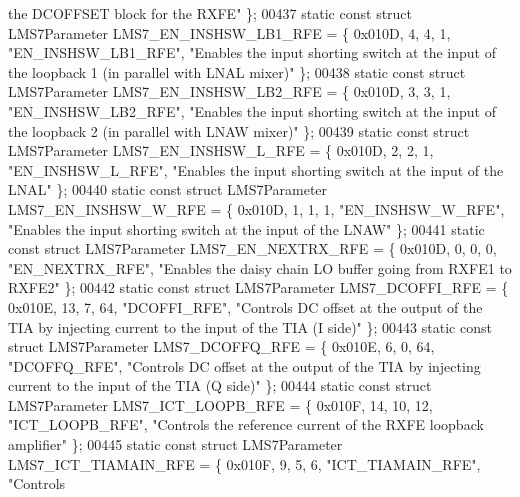 \begin{DoxyCode}
{       the DCOFFSET block for the RXFE"} \};
00437 \textcolor{keyword}{static} \textcolor{keyword}{const} \textcolor{keyword}{struct }LMS7Parameter LMS7_EN_INSHSW_LB1_RFE = \{ 0x010D, 4, 4, 1, \textcolor{stringliteral}{"EN\_INSHSW\_LB1\_RFE"}, \textcolor{stringliteral}{"Enables
       the input shorting switch at the input  of the loopback 1 (in parallel with LNAL mixer)"} \};
00438 \textcolor{keyword}{static} \textcolor{keyword}{const} \textcolor{keyword}{struct }LMS7Parameter LMS7_EN_INSHSW_LB2_RFE = \{ 0x010D, 3, 3, 1, \textcolor{stringliteral}{"EN\_INSHSW\_LB2\_RFE"}, \textcolor{stringliteral}{"Enables
       the input shorting switch at the input  of the loopback 2 (in parallel with LNAW mixer)"} \};
00439 \textcolor{keyword}{static} \textcolor{keyword}{const} \textcolor{keyword}{struct }LMS7Parameter LMS7_EN_INSHSW_L_RFE = \{ 0x010D, 2, 2, 1, \textcolor{stringliteral}{"EN\_INSHSW\_L\_RFE"}, \textcolor{stringliteral}{"Enables the
       input shorting switch at the input  of the LNAL"} \};
00440 \textcolor{keyword}{static} \textcolor{keyword}{const} \textcolor{keyword}{struct }LMS7Parameter LMS7_EN_INSHSW_W_RFE = \{ 0x010D, 1, 1, 1, \textcolor{stringliteral}{"EN\_INSHSW\_W\_RFE"}, \textcolor{stringliteral}{"Enables the
       input shorting switch at the input  of the LNAW"} \};
00441 \textcolor{keyword}{static} \textcolor{keyword}{const} \textcolor{keyword}{struct }LMS7Parameter LMS7_EN_NEXTRX_RFE = \{ 0x010D, 0, 0, 0, \textcolor{stringliteral}{"EN\_NEXTRX\_RFE"}, \textcolor{stringliteral}{"Enables the
       daisy chain LO buffer going from RXFE1  to RXFE2"} \};
00442 \textcolor{keyword}{static} \textcolor{keyword}{const} \textcolor{keyword}{struct }LMS7Parameter LMS7_DCOFFI_RFE = \{ 0x010E, 13, 7, 64, \textcolor{stringliteral}{"DCOFFI\_RFE"}, \textcolor{stringliteral}{"Controls DC offset
       at the output of the TIA by injecting current to the input of the TIA (I side)"} \};
00443 \textcolor{keyword}{static} \textcolor{keyword}{const} \textcolor{keyword}{struct }LMS7Parameter LMS7_DCOFFQ_RFE = \{ 0x010E, 6, 0, 64, \textcolor{stringliteral}{"DCOFFQ\_RFE"}, \textcolor{stringliteral}{"Controls DC offset
       at the output of the TIA by injecting current to the input of the TIA (Q side)"} \};
00444 \textcolor{keyword}{static} \textcolor{keyword}{const} \textcolor{keyword}{struct }LMS7Parameter LMS7_ICT_LOOPB_RFE = \{ 0x010F, 14, 10, 12, \textcolor{stringliteral}{"ICT\_LOOPB\_RFE"}, \textcolor{stringliteral}{"Controls the
       reference current of the RXFE loopback amplifier"} \};
00445 \textcolor{keyword}{static} \textcolor{keyword}{const} \textcolor{keyword}{struct }LMS7Parameter LMS7_ICT_TIAMAIN_RFE = \{ 0x010F, 9, 5, 6, \textcolor{stringliteral}{"ICT\_TIAMAIN\_RFE"}, \textcolor{stringliteral}{"Controls
}
\end{DoxyCode}
